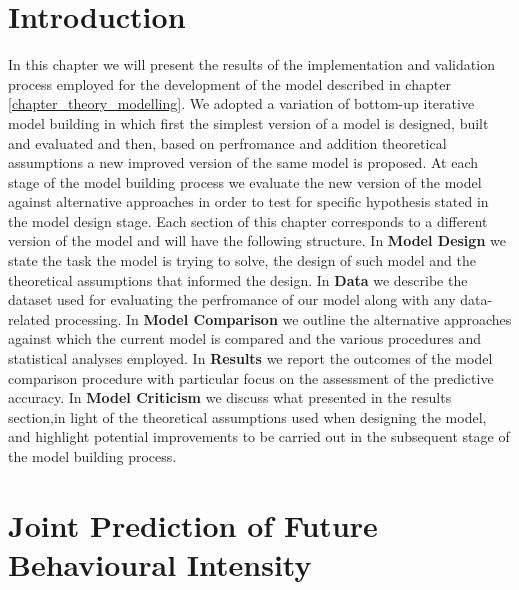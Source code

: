 \section{Introduction}
\label{implementation_testing_introduction}

In this chapter we will present the results of the implementation and validation process employed for the development of the model described in chapter \ref{chapter_theory_modelling}. We adopted a variation of bottom-up iterative model building \cite{gelman2020bayesian} in which first the simplest version of a model is designed, built and evaluated and then, based on perfromance and addition theoretical assumptions a new improved version of the same model is proposed. At each stage of the model building process we evaluate the new version of the model against alternative approaches in order to test for specific hypothesis stated in the model design stage. Each section of this chapter corresponds to a different version of the model and will have the following structure. In \textbf{Model Design} we state the task the model is trying to solve, the design of such model and the theoretical assumptions that informed the design. In \textbf{Data} we describe the dataset used for evaluating the perfromance of our model along with any data-related processing. In \textbf{Model Comparison} we outline the alternative approaches against which the current model is compared and the various procedures and statistical analyses employed. In \textbf{Results} we report the outcomes of the model comparison procedure with particular focus on the assessment of the predictive accuracy. In \textbf{Model Criticism} we discuss what presented in the results section,in light of the theoretical assumptions used when designing the model, and highlight potential improvements to be carried out in the subsequent stage of the model building process.

\section{Joint Prediction of Future Behavioural Intensity}
\label{model_architecture_1}
\lorem
